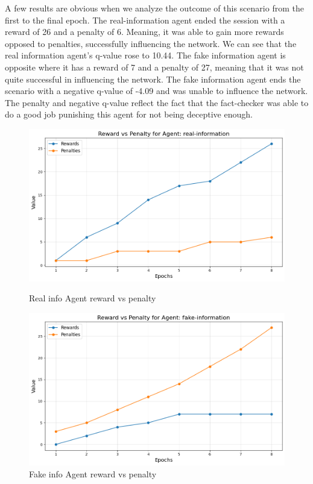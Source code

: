 \documentclass[twoside]{article}
\begin{document}
A few results are obvious when we analyze the outcome of this scenario from the first to the final epoch. The real-information agent ended the session with a reward of 26 and a penalty of 6. Meaning, it was able to gain more rewards opposed to penalties, successfully influencing the network. We can see that the real information agent's q-value rose to 10.44. The fake information agent is opposite where it has a reward of 7 and a penalty of 27, meaning that it was not quite successful in influencing the network. The fake information agent ends the scenario with a negative q-value of -4.09 and was unable to influence the network. The penalty and negative q-value reflect the fact that the fact-checker was able to do a good job punishing this agent for not being deceptive enough.

\begin{figure}[htbp]
     \centering
     \begin{minipage}[b]{0.45\textwidth}
         \centering
         \includegraphics[width=\textwidth]{../results/images/real_info_rp.png}
         \caption{Real info Agent reward vs penalty}
         \label{fig:image1}
     \end{minipage}
     \hfill
     \begin{minipage}[b]{0.45\textwidth}
         \centering
         \includegraphics[width=\textwidth]{../results/images/fake_info_rp.png}
         \caption{Fake info Agent reward vs penalty}
         \label{fig:image2}
     \end{minipage}
 \end{figure}
 
\end{document}
